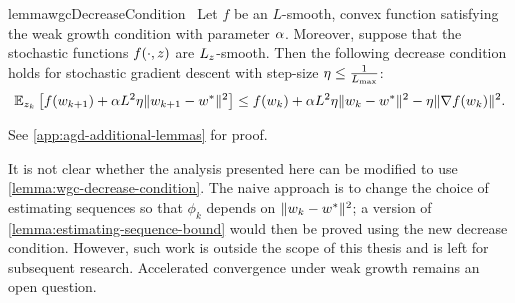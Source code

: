  \begin{restatable}{lemma}{wgcDecreaseCondition}~\label{lemma:wgc-decrease-condition}
    Let \( f \) be an \( L \)-smooth, convex function satisfying the weak growth condition with parameter \( \alpha \). 
    Moreover, suppose that the stochastic functions \( f(\cdot, z) \) are \( L_z \)-smooth.
    Then the following decrease condition holds for stochastic gradient descent with step-size \( \eta \leq \frac{1}{L_{\text{max}}} \):
    \[ \mathbb{E}_{z_{k}} \left[f(w_{k+1}) + \alpha L^2 \eta \|w_{k+1} - w^*\|^2\right] \leq f(w_k) + \alpha L^2 \eta \|w_k - w^*\|^2 - \eta \|\nabla f(w_k)\|^2. \]
\end{restatable}
\noindent See \autoref{app:agd-additional-lemmas} for proof. \hfill \break

It is not clear whether the analysis presented here can be modified to use \autoref{lemma:wgc-decrease-condition}. 
The naive approach is to change the choice of estimating sequences so that \( \phi_k \)  depends on \( \|w_k - w^*\|^2 \); a version of \autoref{lemma:estimating-sequence-bound} would then be proved using the new decrease condition.
However, such work is outside the scope of this thesis and is left for subsequent research.
Accelerated convergence under weak growth remains an open question.


